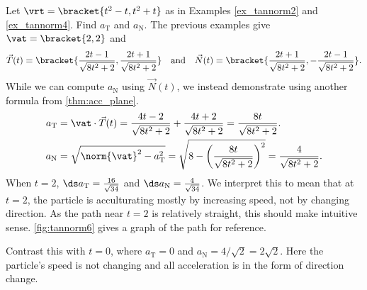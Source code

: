\begin{example}\label{ex_tannorm6}%
Let $\vrt=\bracket{t^2-t,t^2+t}$ as in Examples \ref{ex_tannorm2} and \ref{ex_tannorm4}. Find $a_\mathrm{T}$ and $a_\mathrm{N}$.
\solution
The previous examples give $\vat =\bracket{2,2}$ and
\[\vec T(t) =\bracket{\frac{2t-1}{\sqrt{8t^2+2}},\frac{2t+1}{\sqrt{8t^2+2}}}\quad \text{and}\quad \vec N(t) =\bracket{\frac{2t+1}{\sqrt{8t^2+2}},-\frac{2t-1}{\sqrt{8t^2+2}}}.\]
While we can compute $a_\mathrm{N}$ using $\vec N(t)$, we instead demonstrate using another formula from \autoref{thm:acc_plane}.
\begin{align*}
a_\mathrm{T} &= \vat\cdot\vec T(t) = \frac{4t-2}{\sqrt{8t^2+2}}+\frac{4t+2}{\sqrt{8t^2+2}} = \frac{8t}{\sqrt{8t^2+2}}.\\
a_\mathrm{N} &= \sqrt{\norm{\vat}^2-a_\mathrm{T}^2} = \sqrt{8-\left(\frac{8t}{\sqrt{8t^2+2}}\right)^2}=\frac{4}{\sqrt{8t^2+2}}.\medskip
\end{align*}
When $t=2$, $\ds a_{\mathrm{T}} = \frac{16}{\sqrt{34}}%
$ and $\ds a_{\mathrm{N}} = \frac{4}{\sqrt{34}}%
$. We interpret this to mean that at $t=2$, the particle is acculturating mostly by increasing speed, not by changing direction. As the path near $t=2$ is relatively straight, this should make intuitive sense. \autoref{fig:tannorm6} gives a graph of the path for reference.

Contrast this with $t=0$, where $a_{\mathrm{T}}=0$ and $a_{\mathrm{N}}=4/\sqrt2=2\sqrt2 %
$. Here the particle's speed is not changing and all acceleration is in the form of direction change.
\end{example}

